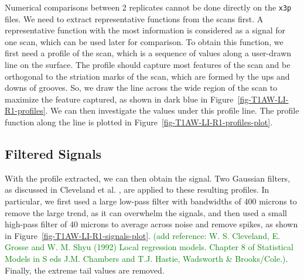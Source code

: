 \documentclass[fleqn,10pt]{wlscirep}
\newcommand{\hh}[1]{{\textcolor{Green}{#1}}}
\begin{document}
Numerical comparisons between 2 replicates cannot be done directly on
the \texttt{x3p} files. We need to extract representative functions from
the scans first. A representative function with the most information is
considered as a signal for one scan, which can be used later for
comparison. To obtain this function, we first need a profile of the
scan, which is a sequence of values along a user-drawn line on the
surface. The profile should capture most features of the scan and be
orthogonal to the striation marks of the scan, which are formed by the
ups and downs of grooves. So, we draw the line across the wide region of
the scan to maximize the feature captured, as shown in dark blue in
Figure~\ref{fig-T1AW-LI-R1-profiles}. We can then investigate the values
under this profile line. The profile function along the line is plotted
in Figure~\ref{fig-T1AW-LI-R1-profiles-plot}.

\subsection*{Filtered Signals}\label{sec-filtered-signals}

With the profile extracted, we can then obtain the signal. Two Gaussian
filters, as discussed in Cleveland et al.
\citep{clevelandLocalRegressionModels1992}, are applied to these
resulting profiles. In particular, we first used a large low-pass filter
with bandwidths of 400 microns to remove the large trend, as it can
overwhelm the signals, and then used a small high-pass filter of 40
microns to average across noise and remove spikes, as shown in
Figure~\ref{fig-T1AW-LI-R1-signals-plot}.
\hh{(add reference: W. S. Cleveland, E. Grosse and W. M. Shyu (1992) Local regression models. Chapter 8 of Statistical Models in S eds J.M. Chambers and T.J. Hastie, Wadsworth \& Brooks/Cole.)}.
Finally, the extreme tail values are removed.
\end{document}

